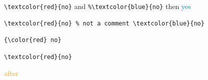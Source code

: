 \verb|\textcolor{red}{no}| and \verb*+%\textcolor{blue}{no}+ then \textcolor{teal}{yes}
\begin{verbatim}
\textcolor{red}{no} % not a comment \textcolor{blue}{no}
\end{verbatim}
\begin{lstlisting}
{\color{red} no}
\end{lstlisting}
\begin{verbatim}
\textcolor{red}{no}
\end{verbatim}

\textcolor{orange}{after}
